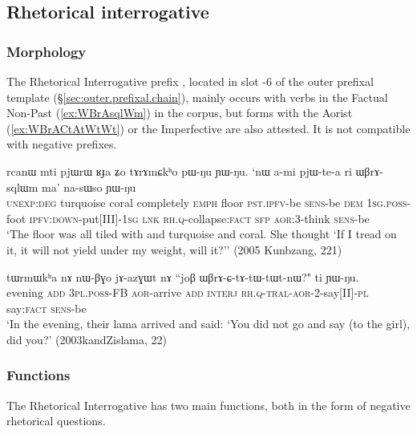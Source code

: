 
\subsection{Rhetorical interrogative} \label{sec:WBrA} 

\subsubsection{Morphology} \label{sec:WBrA.morphology} 
The Rhetorical Interrogative prefix , located in slot -6 of the outer prefixal template (§\ref{sec:outer.prefixal.chain}),  mainly occurs with verbs in the Factual Non-Past (\ref{ex:WBrAsqlWm}) in the corpus, but forms with the Aorist (\ref{ex:WBrACtAtWtWt}) or the Imperfective are also attested. It is not compatible with negative prefixes.

\begin{exe}
\ex \label{ex:WBrAsqlWm}
\gll rcanɯ mti pjɯrɯ ʁɟa ʑo tɤrɤmɕkʰo pɯ-ŋu ɲɯ-ŋu. `nɯ a-mi pjɯ-te-a ri ɯβrɤ-sqlɯm ma' na-sɯso ɲɯ-ŋu \\
\textsc{unexp}:\textsc{deg} turquoise  coral completely \textsc{emph} floor \textsc{pst}.\textsc{ipfv}-be \textsc{sens}-be \textsc{dem} \textsc{1sg}.\textsc{poss}-foot \textsc{ipfv}:\textsc{down}-put[III]-\textsc{1sg} \textsc{lnk} \textsc{rh}.\textsc{q}-collapse:\textsc{fact} \textsc{sfp} \textsc{aor}:3\flobv{}-think \textsc{sens}-be \\
\glt `The floor was all tiled with and turquoise and coral. She thought `If I tread on it, it will not yield under my weight, will it?'' (2005 Kunbzang, 221)
\end{exe}

\begin{exe}
\ex \label{ex:WBrACtAtWtWt}
\gll tɯrmɯkʰa nɤ nɯ-βɣo jɤ-azɣɯt nɤ ``joβ ɯβrɤ-ɕ-tɤ-tɯ-tɯt-nɯ?" ti ɲɯ-ŋu. \\
evening \textsc{add} \textsc{3pl}.\textsc{poss}-FB \textsc{aor}-arrive \textsc{add} \textsc{interj} \textsc{rh}.\textsc{q}-\textsc{tral}-\textsc{aor}-2-say[II]-\textsc{pl} say:\textsc{fact} \textsc{sens}-be \\
\glt `In the evening, their lama arrived and said: `You did not go and say  (to the girl), did you?' (2003kandZislama, 22)
 \end{exe}
 
\subsubsection{Functions} \label{sec:WBrA.functions} 
The Rhetorical Interrogative has two main functions, both in the form of negative rhetorical questions. 

